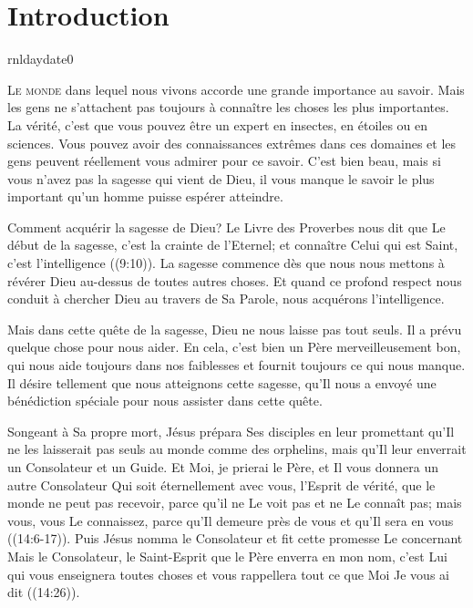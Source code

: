 
\chapter{Introduction}

\expandafter\xdef\csname jrnldaydate0

\lettrine{L}{e monde} dans lequel nous vivons accorde une grande
 importance au savoir. Mais les gens ne s'attachent pas toujours
 à connaître les choses les plus importantes.
 La vérité, c'est que vous pouvez être un expert en insectes,
 en étoiles ou en sciences. Vous pouvez avoir des connaissances extrêmes
 dans ces domaines et les gens peuvent réellement vous admirer pour ce savoir.
 C'est bien beau, mais si vous n'avez pas la sagesse qui vient de Dieu,
 il vous manque le savoir le plus important qu'un homme puisse espérer atteindre.

Comment acquérir la sagesse de Dieu? Le Livre des Proverbes nous dit que
 \Og Le début de la sagesse, c'est la crainte de l'Eternel;
 et connaître Celui qui est Saint, c'est l'intelligence \Fg{}
 ((9:10)).
 La sagesse commence dès que nous nous mettons à révérer Dieu au-dessus
 de toutes autres choses. Et quand ce profond respect nous conduit
 à chercher Dieu au travers de Sa Parole, nous acquérons l'intelligence.

Mais dans cette quête de la sagesse, Dieu ne nous laisse pas tout seuls.
 Il a prévu quelque chose pour nous aider. En cela, c'est bien un Père
 merveilleusement bon, qui nous aide toujours dans nos faiblesses et fournit
 toujours ce qui nous manque. Il désire tellement que nous atteignons cette
 sagesse, qu'Il nous a envoyé une bénédiction spéciale pour nous assister
 dans cette quête. 

Songeant à Sa propre mort, Jésus prépara Ses disciples en leur promettant
 qu'Il ne les laisserait pas seuls au monde comme des orphelins,
 mais qu'Il leur enverrait un Consolateur et un Guide.
 \Og Et Moi, je prierai le Père, et Il vous donnera un autre Consolateur
 Qui soit éternellement avec vous, l'Esprit de vérité, que le monde
 ne peut pas recevoir, parce qu'il ne Le voit pas et ne Le connaît pas;
 mais vous, vous Le connaissez, parce qu'Il demeure près de vous
 et qu'Il sera en vous \Fg{} ((14:6-17)).
 Puis Jésus nomma le Consolateur et fit cette promesse Le concernant\frcolon{}
 \Og Mais le Consolateur, le Saint-Esprit que le Père enverra en mon nom,
 c'est Lui qui vous enseignera toutes choses et vous rappellera tout ce que
 Moi Je vous ai dit \Fg{} ((14:26)).

